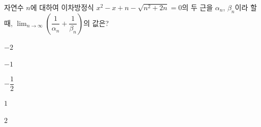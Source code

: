 자연수 $n$에 대하여 이차방정식 $x^2-x+n-\sqrt{n^2+2n}=0$의 두 근을 $\alpha_n$, $\beta_n$이라 할 때, $\displaystyle\lim_{n\to\infty}\left(\dfrac{1}{\alpha_n}+\dfrac{1}{\beta_n}\right)$의 값은?
\begin{choices32}{\rule[-3ex]{0pt}{8ex}$-2$}{\rule[-3ex]{0pt}{8ex}$-1$}{\rule[-3ex]{0pt}{8ex}$-\dfrac{1}{2}$}{\rule[-3ex]{0pt}{8ex}$1$}{\rule[-3ex]{0pt}{8ex}$2$}\end{choices32}
